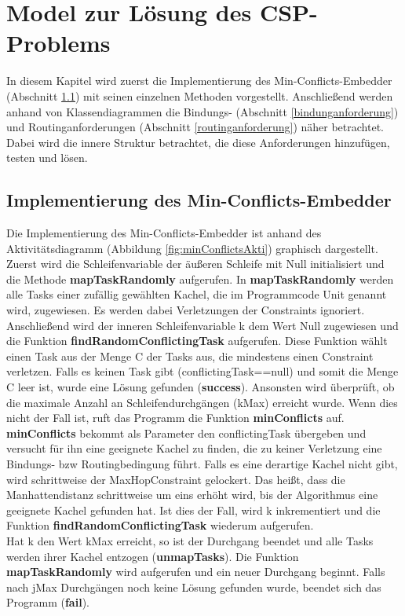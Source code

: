 \chapter{Model zur Lösung des CSP-Problems}\label{model}

In diesem Kapitel wird zuerst die Implementierung des Min-Conflicts-Embedder (Abschnitt \ref{minConflict}) mit seinen einzelnen Methoden vorgestellt. Anschließend werden anhand von Klassendiagrammen die Bindungs- (Abschnitt \ref{bindunganforderung}) und Routinganforderungen (Abschnitt \ref{routinganforderung}) näher betrachtet. Dabei wird die innere Struktur betrachtet, die diese Anforderungen hinzufügen, testen und lösen.
\section{Implementierung des Min-Conflicts-Embedder}\label{minConflict}

Die Implementierung des Min-Conflicts-Embedder ist anhand des Aktivitätsdiagramm (Abbildung \ref{fig:minConflictsAkti}) graphisch dargestellt. Zuerst wird die Schleifenvariable der äußeren Schleife mit Null initialisiert und die Methode \textbf{mapTaskRandomly} aufgerufen. In \textbf{mapTaskRandomly} werden alle Tasks einer zufällig gewählten Kachel, die im Programmcode Unit genannt wird, zugewiesen. Es werden dabei Verletzungen der Constraints ignoriert. Anschließend wird der inneren Schleifenvariable k dem Wert Null zugewiesen und die Funktion \textbf{findRandomConflictingTask} aufgerufen. Diese Funktion wählt einen Task aus der Menge C der Tasks aus, die mindestens einen Constraint verletzen. Falls es keinen Task gibt (conflictingTask==null) und somit die Menge C leer ist, wurde eine Lösung gefunden (\textbf{success}). Ansonsten wird überprüft, ob die maximale Anzahl an Schleifendurchgängen (kMax) erreicht wurde. Wenn dies nicht der Fall ist, ruft das Programm die Funktion \textbf{minConflicts} auf. \textbf{minConflicts} bekommt als Parameter den conflictingTask übergeben und versucht für ihn eine geeignete Kachel zu finden, die zu keiner Verletzung eine Bindungs- bzw Routingbedingung führt. Falls es eine derartige Kachel nicht gibt, wird schrittweise der MaxHopConstraint gelockert. Das heißt, dass die Manhattendistanz schrittweise um eins erhöht wird, bis der Algorithmus eine geeignete Kachel gefunden hat. Ist dies der Fall, wird k inkrementiert und die Funktion \textbf{findRandomConflictingTask} wiederum aufgerufen. \\
Hat k den Wert kMax erreicht, so ist der Durchgang beendet und alle Tasks werden ihrer Kachel entzogen (\textbf{unmapTasks}). Die Funktion \textbf{mapTaskRandomly} wird aufgerufen und ein neuer Durchgang beginnt. Falls nach jMax Durchgängen noch keine Lösung gefunden wurde, beendet sich das Programm (\textbf{fail}).

